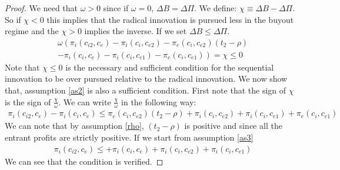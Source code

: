 \documentclass[12pt]{report}
\numberwithin{equation}{section}
\begin{document}
\begin{proof}
We need that $\omega>0$ since if $\omega=0$, $\Delta B= \Delta \Pi$. We define: $ \chi \equiv \Delta B - \Delta \Pi $. So if $\chi<0$ this implies that the radical innovation is pursued less in the buyout regime and the $\chi>0$ implies the inverse. If we set $\Delta B \leq \Delta \Pi $.  
\begin{align*}
\omega \left(  \pi_{i}(c_{i2},c_{e})- \pi_{i}(c_{i},c_{e2})-\pi_{e}(c_{i},c_{e2})  \left( t_2- \rho \right) \right. \\
-\left.\pi_i(c_i,c_{e})-\pi_i(c_i,c_{e1})-\pi_e(c_i,c_{e1}) \right) = \chi \leq 0 
\end{align*}
Note that $\chi \leq 0$ is the necessary and sufficient condition for the sequential innovation to be over pursued relative to the radical innovation. We now show that, assumption \ref{as2} is also a sufficient condition. First note that the sign of $\chi$ is the sign of $\frac{\chi}{\omega}$. We can write $\frac{\chi}{\omega}$ in the following way: 
\begin{align*}
\pi_{i}(c_{i2},c_{e})-  \pi_i(c_i,c_{e})\leq \pi_{e}(c_{i},c_{e2})  \left( t_2- \rho \right) +
\pi_{i}(c_{i},c_{e2}) +\pi_i(c_i,c_{e1})+\pi_e(c_i,c_{e1}) 
\end{align*}
We can note that by assumption \ref{rho}, $\left( t_2- \rho \right)$ is positive and since all the entrant profits are strictly positive. If we start from assumption \ref{as3}
\begin{align*}
\pi_{i}(c_{i2},c_{e}) \leq +\pi_i(c_i,c_{e})+
\pi_{i}(c_{i},c_{e2}) +\pi_i(c_i,c_{e1})
\end{align*}
We can see that the condition is verified. 




\end{proof}
\end{document}
